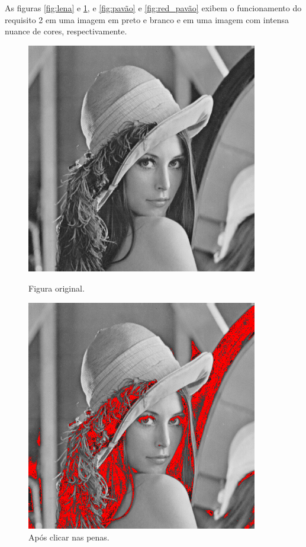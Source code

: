\documentclass{bmvc2k}
\begin{document}
As figuras \ref{fig:lena} e \ref{fig:red_lena}, e \ref{fig:pavão} e \ref{fig:red_pavão} exibem o funcionamento do requisito 2 em uma imagem em preto e branco e em uma imagem com intensa nuance de cores, respectivamente.

\begin{figure}[htb]
    \centering
    \begin{minipage}{0.45\textwidth}
        \centering
        \includegraphics[width=0.9\textwidth]{Figs/lena.png}
        \caption{Figura original.}
        \label{fig:lena}
    \end{minipage}\hfill
    \begin{minipage}{0.45\textwidth}
        \centering
        \includegraphics[width=0.9\textwidth]{Figs/red_lena.png}
        \caption{Após clicar nas penas.}
        \label{fig:red_lena}
    \end{minipage}
\end{figure}
\end{document}
